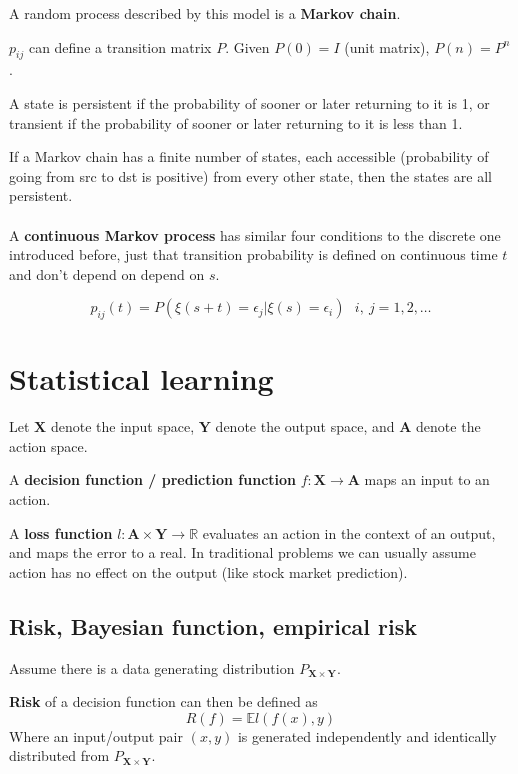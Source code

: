 \documentclass{article}
\begin{document}
A random process described by this model is a \textbf{Markov chain}.

$p_{ij}$ can define a transition matrix $P$.
Given $P(0) = I$ (unit matrix), $P(n) = P^n$.

A state is persistent if the probability of sooner or later returning to it is 1, or transient if the probability of sooner or later returning to it is less than 1.

If a Markov chain has a finite number of states, each accessible (probability of going from src to dst is positive) from every other state, then the states are all persistent.
\\
\\
A \textbf{continuous Markov process} has similar four conditions to the discrete one introduced before, just that transition probability is defined on continuous time $t$ and don't depend on depend on $s$.

$$
p_{ij}(t) = P(\xi(s + t) = \epsilon_j | \xi(s) = \epsilon_i) ~ ~ ~ i, ~j = 1, 2, \dots
$$

\section{Statistical learning}

Let $\mathbf{X}$ denote the input space, $\mathbf{Y}$ denote the output space, and $\mathbf{A}$ denote the action space.

A \textbf{decision function / prediction function} $f: \mathbf{X} \to \mathbf{A}$ maps an input to an action.

A \textbf{loss function} $\mathit{l}: \mathbf{A} \times \mathbf{Y} \to \mathbb{R}$ evaluates an action in the context of an output, and maps the error to a real.
In traditional problems we can usually assume action has no effect on the output (like stock market prediction).

\subsection{Risk, Bayesian function, empirical risk}

Assume there is a data generating distribution $P_{\mathbf{X} \times \mathbf{Y}}$.

\textbf{Risk} of a decision function can then be defined as
$$
R(f) = \mathbb{E}\mathit{l}(f(x), y)
$$
Where an input/output pair $(x, y)$ is generated independently and identically distributed from $P_{\mathbf{X} \times \mathbf{Y}}$.
\end{document}
